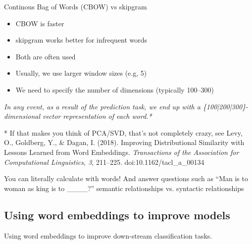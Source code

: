 \documentclass[compress]{beamer}
\begin{document}
\begin{frame}{Continous Bag of Words (CBOW) vs skipgram}
	\begin{itemize}
		\item CBOW is faster
		\item skipgram works better for infrequent words
		\item Both are often used
		\item Usually, we use larger window sizes (e.g, 5)
		\item We need to specify the number of dimensions (typically 100--300)
	\end{itemize}
	\pause
	
	\textit{In any event, as a result of the prediction task, we end up with a \{100|200|300\}-dimensional vector representation of each word.*}
	
	
	\tiny{* If that makes you think of PCA/SVD, that's not completely crazy, see Levy, O., Goldberg, Y., \& Dagan, I. (2018). Improving Distributional Similarity with Lessons Learned from Word Embeddings. \textit{Transactions of the Association for Computational Linguistics, 3}, 211--225. doi:10.1162/tacl\_a\_00134}\\
\end{frame}




\begin{frame}{You can literally calculate with words!}
	And answer questions such as ``Man is to woman as king is to \_\_\_\_?''
	semantic relationships vs. syntactic relationships
\end{frame}


\subsection[Improving down-stream classification tasks]{Using word embeddings to improve models}
\begin{frame}[plain]
	Using word embeddings to improve down-stream classification tasks.
\end{frame}
\end{document}
